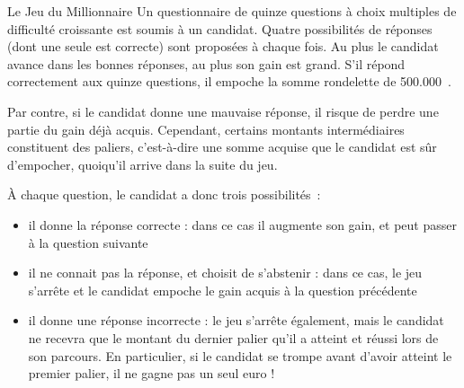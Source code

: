 \begin{Exercice}{Le Jeu du Millionnaire}
	Un questionnaire de quinze questions à choix
	multiples de difficulté croissante est soumis à un candidat. Quatre
	possibilités de réponses (dont une seule est correcte) sont proposées à
	chaque fois. Au plus le candidat avance dans les bonnes réponses, au
	plus son gain est grand. S’il répond correctement aux quinze questions,
	il empoche la somme rondelette de 500.000~\texteuro.
	
	Par contre, si le candidat donne une mauvaise
	réponse, il risque de perdre une partie du gain déjà acquis. Cependant,
	certains montants intermédiaires constituent des paliers, c’est-à-dire
	une somme acquise que le candidat est sûr d’empocher, quoiqu’il arrive
	dans la suite du jeu.

	À chaque question, le candidat a donc trois
	possibilités~:
	\begin{itemize}
		\item 
			il donne la réponse correcte : dans ce cas il
			augmente son gain, et peut passer à la question suivante
		\item 
			il ne connait pas la réponse, et choisit de
			s’abstenir : dans ce cas, le jeu s’arrête et le candidat empoche le
			gain acquis à la question précédente
		\item 
			il donne une réponse incorrecte : le jeu
			s’arrête également, mais le candidat ne recevra que le montant du
			dernier palier qu’il a atteint et réussi lors de son parcours. En
			particulier, si le candidat se trompe avant d’avoir atteint le premier
			palier, il ne gagne pas un seul euro !
	\end{itemize}
	

\end{Exercice}
